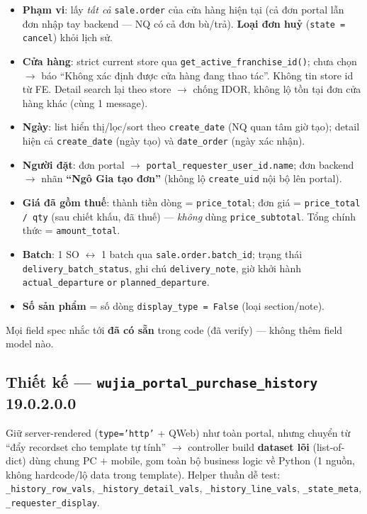 \begin{itemize}
\item \textbf{Phạm vi}: lấy \emph{tất cả} \texttt{sale.order} của cửa hàng hiện tại (cả đơn
      portal lẫn đơn nhập tay backend --- NQ có cả đơn bù/trả). \textbf{Loại đơn huỷ}
      (\texttt{state = cancel}) khỏi lịch sử.
\item \textbf{Cửa hàng}: strict current store qua \texttt{get\_active\_franchise\_id()}; chưa
      chọn $\rightarrow$ báo ``Không xác định được cửa hàng đang thao tác''. Không tin store id
      từ FE. Detail search lại theo store $\rightarrow$ chống IDOR, không lộ tồn tại đơn cửa
      hàng khác (cùng 1 message).
\item \textbf{Ngày}: list hiển thị/lọc/sort theo \texttt{create\_date} (NQ quan tâm giờ tạo);
      detail hiện cả \texttt{create\_date} (ngày tạo) và \texttt{date\_order} (ngày xác nhận).
\item \textbf{Người đặt}: đơn portal $\rightarrow$ \texttt{portal\_requester\_user\_id.name};
      đơn backend $\rightarrow$ nhãn \textbf{``Ngô Gia tạo đơn''} (không lộ \texttt{create\_uid}
      nội bộ lên portal).
\item \textbf{Giá đã gồm thuế}: thành tiền dòng = \texttt{price\_total}; đơn giá =
      \texttt{price\_total / qty} (sau chiết khấu, đã thuế) --- \emph{không} dùng
      \texttt{price\_subtotal}. Tổng chính thức = \texttt{amount\_total}.
\item \textbf{Batch}: 1 SO $\leftrightarrow$ 1 batch qua \texttt{sale.order.batch\_id}; trạng thái
      \texttt{delivery\_batch\_status}, ghi chú \texttt{delivery\_note}, giờ khởi hành
      \texttt{actual\_departure} \texttt{or} \texttt{planned\_departure}.
\item \textbf{Số sản phẩm} = số dòng \texttt{display\_type = False} (loại section/note).
\end{itemize}

Mọi field spec nhắc tới \textbf{đã có sẵn} trong code (đã verify) --- không thêm field model nào.

\subsection{Thiết kế --- \texttt{wujia\_portal\_purchase\_history} 19.0.2.0.0}

Giữ server-rendered (\texttt{type='http'} + QWeb) như toàn portal, nhưng chuyển từ ``đẩy
recordset cho template tự tính'' $\rightarrow$ controller build \textbf{dataset lõi} (list-of-dict)
dùng chung PC + mobile, gom toàn bộ business logic về Python (1 nguồn, không hardcode/lộ data
trong template). Helper thuần dễ test: \texttt{\_history\_row\_vals}, \texttt{\_history\_detail\_vals},
\texttt{\_history\_line\_vals}, \texttt{\_state\_meta}, \texttt{\_requester\_display}.

